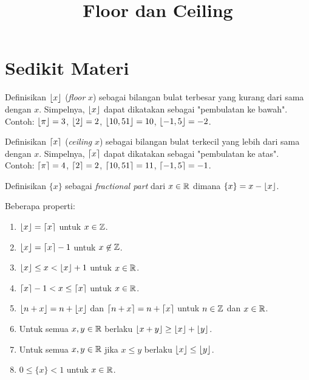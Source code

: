 \documentclass[12pt]{scrartcl}
\title{Floor dan Ceiling}
\begin{document}
\maketitle

\renewcommand*\contentsname{Daftar Isi}
\tableofcontents

\newpage
\section{Sedikit Materi}
Definisikan $\left\lfloor x \right\rfloor$ (\textit{floor} $x$) sebagai bilangan bulat terbesar yang kurang dari sama dengan $x$. Simpelnya, $\left\lfloor x \right\rfloor$ dapat dikatakan sebagai "pembulatan ke bawah". Contoh: $\left\lfloor \pi \right\rfloor=3$, $\left\lfloor 2 \right\rfloor=2$, $\left\lfloor 10,51 \right\rfloor=10$, $\left\lfloor -1,5 \right\rfloor=-2$.

Definisikan $\left\lceil x \right\rceil$ (\textit{ceiling} $x$) sebagai bilangan bulat terkecil yang lebih dari sama dengan $x$. Simpelnya, $\left\lceil x \right\rceil$ dapat dikatakan sebagai "pembulatan ke atas". Contoh: $\left\lceil \pi \right\rceil=4$, $\left\lceil 2 \right\rceil=2$, $\left\lceil 10,51 \right\rceil=11$, $\left\lceil -1,5 \right\rceil=-1$.

Definisikan $\{x\}$ sebagai \textit{fractional part} dari $x \in \mathbb R$ dimana $\{x\} = x - \left\lfloor x \right\rfloor$.

Beberapa properti:
\begin{enumerate}
    \item $\left\lfloor x \right\rfloor=\left\lceil x \right\rceil$ untuk $x \in \mathbb Z$.
    \item $\left\lfloor x \right\rfloor=\left\lceil x \right\rceil-1$ untuk $x \not \in \mathbb Z$.
    \item $\left\lfloor x \right\rfloor \le  x < \left\lfloor x \right\rfloor+1$ untuk $x \in \mathbb R$.
    \item $\left\lceil x \right\rceil-1 < x \le \left\lceil x \right\rceil$ untuk $x \in \mathbb R$.
    \item $\left\lfloor n+x \right\rfloor=n+\left\lfloor x \right\rfloor$ dan $\left\lceil n+x \right\rceil=n+\left\lceil x \right\rceil$ untuk $n\in \mathbb Z$ dan $x \in \mathbb R$.
    \item Untuk semua $x,y \in \mathbb R$ berlaku $\left\lfloor x+y \right\rfloor \ge \left\lfloor x \right\rfloor+\left\lfloor y \right\rfloor$.
    \item Untuk semua $x,y \in \mathbb R$ jika $x \le y$ berlaku $\left\lfloor x \right\rfloor \le \left\lfloor y \right\rfloor$.
    \item $0 \le \{x\} < 1$ untuk $x \in \mathbb R$.
\end{enumerate}
\end{document}
